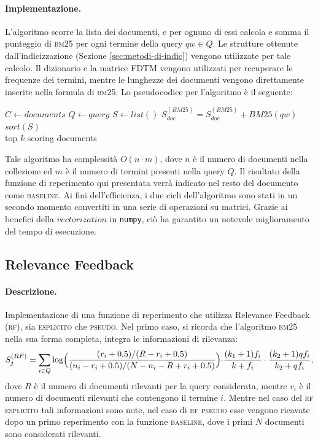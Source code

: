 \paragraph{\textbf{Implementazione.}}
L'algoritmo scorre la lista dei documenti, e per ognuno di essi calcola e somma il punteggio di \textsc{bm25} per ogni termine della query $qw \in Q$. Le strutture ottenute dall'indicizzazione (Sezione \ref{sec:metodi-di-indic}) vengono utilizzate per tale calcolo. Il dizionario e la matrice FDTM vengono utilizzati per recuperare le frequenze dei termini, mentre le lunghezze dei documenti vengono direttamente inserite nella formula di \textsc{bm25}. Lo pseudocodice per l'algoritmo \`e il seguente:
\begin{algorithmic}
\State $C \gets documents$
\State $Q \gets query$
\State $S \gets list()$
		\State $S^{(BM25)}_{doc} = S^{(BM25)}_{doc} + BM25(qw)$
	\EndFor
\EndFor
\State $sort(S)$\\
\Return top $k$ scoring documents
\end{algorithmic}
Tale algoritmo ha complessit\`a  $O(n \cdot m)$, dove $n$ \`e il numero di documenti nella collezione ed $m$ \`e il numero di termini presenti nella query $Q$. Il risultato della funzione di reperimento qui presentata verr\`a  indicato nel resto del documento come \textsc{baseline}. Ai fini dell'efficienza, i due cicli dell'algoritmo sono stati in un secondo momento convertiti in una serie di operazioni su matrici. Grazie ai benefici della $vectorization$ in \texttt{numpy}, ci\`o ha garantito un notevole miglioramento del tempo di esecuzione.
\subsection{Relevance Feedback}
\label{sec:relevance-feedback}

\paragraph{\textbf{Descrizione.}}
Implementazione di una funzione di reperimento che utilizza Relevance Feedback (\textsc{rf}), sia \textsc{esplicito} che \textsc{pseudo}. Nel primo caso, si ricorda che l'algoritmo \textsc{bm25} nella sua forma completa, integra le informazioni di rilevanza:
\[ S^{(RF)}_j = \sum\limits_{i \in Q}\log\Bigl(\frac{(r_i+0.5)/(R-r_i+0.5)}{(n_i-r_i+0.5)/(N-n_i-R+r_i+0.5)}\Bigl)\cdot\frac{(k_1+1)f_i}{k+f_i}\cdot\frac{(k_2+1)qf_i}{k_2+qf_i}, \]
dove $R$ \`e il numero di documenti rilevanti per la query considerata, mentre $r_i$ \`e il numero di documenti rilevanti che contengono il termine $i$. Mentre nel caso del \textsc{rf esplicito} tali informazioni sono note, nel caso di \textsc{rf pseudo} esse vengono ricavate dopo un primo reperimento con la funzione \textsc{baseline}, dove i primi $N$ documenti sono considerati rilevanti.

